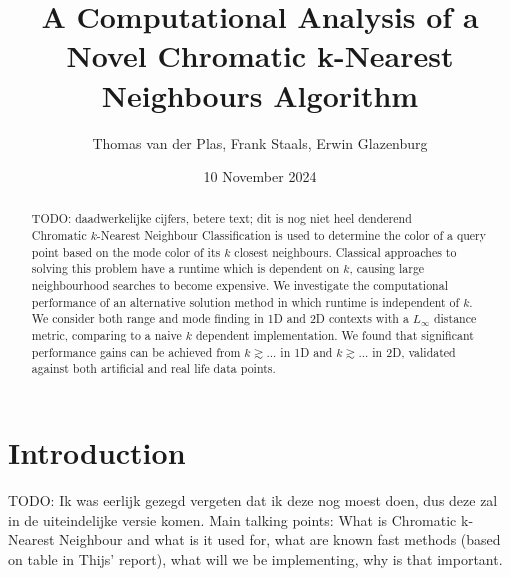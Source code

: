 \documentclass{article}
\title{A Computational Analysis of a Novel Chromatic k-Nearest Neighbours Algorithm}
\author{Thomas van der Plas, Frank Staals, Erwin Glazenburg}
\date{10 November 2024}
\begin{document}
\maketitle

\begin{abstract}
    \noindent TODO: daadwerkelijke cijfers, betere text; dit is nog niet heel denderend \\
    Chromatic $k$-Nearest Neighbour Classification is used to determine the color of a query point based on the mode color of its $k$ closest neighbours. Classical approaches to solving this problem have a runtime which is dependent on $k$, causing large neighbourhood searches to become expensive. We investigate the computational performance of an alternative solution method in which runtime is independent of $k$. We consider both range and mode finding in 1D and 2D contexts with a $L_\infty$ distance metric, comparing to a naive $k$ dependent implementation. We found that significant performance gains can be achieved from $k \gtrsim ...$ in 1D and $k \gtrsim ...$ in 2D, validated against both artificial and real life data points.
\end{abstract}

\section{Introduction}
TODO: Ik was eerlijk gezegd vergeten dat ik deze nog moest doen, dus deze zal
in de uiteindelijke versie komen. Main talking points: What is Chromatic
k-Nearest Neighbour and what is it used for, what are known fast methods (based
on table in Thijs' report), what will we be implementing, why is that
important.
\end{document}
